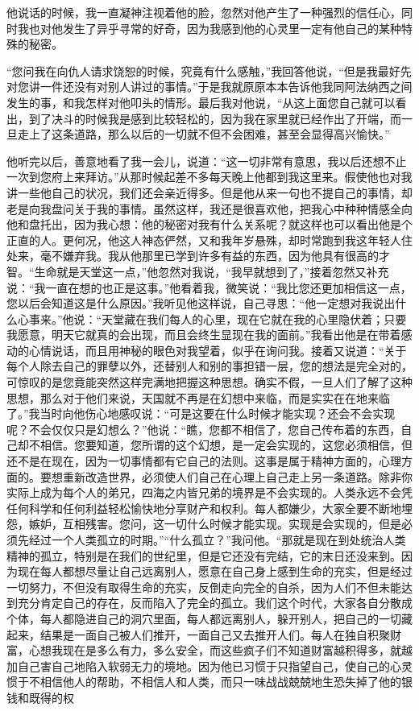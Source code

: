\par 他说话的时候，我一直凝神注视着他的脸，忽然对他产生了一种强烈的信任心，同时我也对他发生了异乎寻常的好奇，因为我感到他的心灵里一定有他自己的某种特殊的秘密。
\par “您问我在向仇人请求饶恕的时候，究竟有什么感触，”我回答他说，“但是我最好先对您讲一件还没有对别人讲过的事情。”于是我就原原本本告诉他我同阿法纳西之间发生的事，和我怎样对他叩头的情形。最后我对他说，“从这上面您自己就可以看出，到了决斗的时候我是感到比较轻松的，因为我在家里就已经作出了开端，而一旦走上了这条道路，那么以后的一切就不但不会困难，甚至会显得高兴愉快。”
\par 他听完以后，善意地看了我一会儿，说道：“这一切非常有意思，我以后还想不止一次到您府上来拜访。”从那时候起差不多每天晚上他都到我这里来。假使他也对我讲一些他自己的状况，我们还会亲近得多。但是他从来一句也不提自己的事情，却老是向我盘问关于我的事情。虽然这样，我还是很喜欢他，把我心中种种情感全向他和盘托出，因为我心想：他的秘密对我有什么关系呢？就这样也可以看出他是个正直的人。更何况，他这人神态俨然，又和我年岁悬殊，却时常跑到我这年轻人住处来，毫不嫌弃我。我从他那里已学到许多有益的东西，因为他具有很高的才智。“生命就是天堂这一点，”他忽然对我说，“我早就想到了，”接着忽然又补充说：“我一直在想的也正是这事。”他看着我，微笑说：“我比您还更加相信这一点，您以后会知道这是什么原因。”我听见他这样说，自己寻思：“他一定想对我说出什么心事来。”他说：“天堂藏在我们每人的心里，现在它就在我的心里隐伏着；只要我愿意，明天它就真的会出现，而且会终生显现在我的面前。”我看出他是在带着感动的心情说话，而且用神秘的眼色对我望着，似乎在询问我。接着又说道：“关于每个人除去自己的罪孽以外，还替别人和别的事担错一层，您的想法是完全对的，可惊叹的是您竟能突然这样完满地把握这种思想。确实不假，一旦人们了解了这种思想，那么对于他们来说，天国就不再是在幻想中来临，而是实实在在地来临了。”我当时向他伤心地感叹说：“可是这要在什么时候才能实现？还会不会实现呢？不会仅仅只是幻想么？”他说：“瞧，您都不相信了，您自己传布着的东西，自己却不相信。您要知道，您所谓的这个幻想，是一定会实现的，这您必须相信，但还不是在现在，因为一切事情都有它自己的法则。这事是属于精神方面的，心理方面的。要想重新改造世界，必须使人们自己在心理上自己走上另一条道路。除非你实际上成为每个人的弟兄，四海之内皆兄弟的境界是不会实现的。人类永远不会凭任何科学和任何利益轻松愉快地分享财产和权利。每人都嫌少，大家全要不断地埋怨，嫉妒，互相残害。您问，这一切什么时候才能实现。实现是会实现的，但是必须先经过一个人类孤立的时期。”“什么孤立？”我问他。“那就是现在到处统治人类精神的孤立，特别是在我们的世纪里，但是它还没有完结，它的末日还没来到。因为现在每人都想尽量让自己远离别人，愿意在自己身上感到生命的充实，但是经过一切努力，不但没有取得生命的充实，反倒走向完全的自杀，因为人们不但未能达到充分肯定自己的存在，反而陷入了完全的孤立。我们这个时代，大家各自分散成个体，每人都隐进自己的洞穴里面，每人都远离别人，躲开别人，把自己的一切藏起来，结果是一面自己被人们推开，一面自己又去推开人们。每人在独自积聚财富，心想我现在是多么有力，多么安全，而这些疯子们不知道财富越积得多，就越加自己害自己地陷入软弱无力的境地。因为他已习惯于只指望自己，使自己的心灵惯于不相信他人的帮助，不相信人和人类，而只一味战战兢兢地生恐失掉了他的银钱和既得的权
